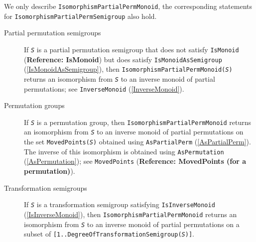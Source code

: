\documentclass[a4paper,11pt]{report}
\begin{document}
{{{ We only describe \texttt{IsomorphismPartialPermMonoid}, the corresponding statements for \texttt{IsomorphismPartialPermSemigroup} also hold. 
\begin{description}
\item[{Partial permutation semigroups}]  If \mbox{\texttt{\mdseries\slshape S}} is a partial permutation semigroup that does not satisfy \texttt{IsMonoid} (\textbf{Reference: IsMonoid}) but does satisfy \texttt{IsMonoidAsSemigroup} (\ref{IsMonoidAsSemigroup}), then \texttt{IsomorphismPartialPermMonoid(\mbox{\texttt{\mdseries\slshape S}})} returns an isomorphism from \mbox{\texttt{\mdseries\slshape S}} to an inverse monoid of partial permutations; see \texttt{InverseMonoid} (\ref{InverseMonoid}). 
\item[{Permutation groups}]  If \mbox{\texttt{\mdseries\slshape S}} is a permutation group, then \texttt{IsomorphismPartialPermMonoid} returns an isomorphism from \mbox{\texttt{\mdseries\slshape S}} to an inverse monoid of partial permutations on the set \texttt{MovedPoints(\mbox{\texttt{\mdseries\slshape S}})} obtained using \texttt{AsPartialPerm} (\ref{AsPartialPerm}). The inverse of this isomorphism is obtained using \texttt{AsPermutation} (\ref{AsPermutation}); see \texttt{MovedPoints} (\textbf{Reference: MovedPoints (for a permutation)}). 
\item[{Transformation semigroups}]  If \mbox{\texttt{\mdseries\slshape S}} is a transformation semigroup satisfying \texttt{IsInverseMonoid} (\ref{IsInverseMonoid}), then \texttt{IsomorphismPartialPermMonoid} returns an isomorphism from \mbox{\texttt{\mdseries\slshape S}} to an inverse monoid of partial permutations on a subset of \texttt{[1..DegreeOfTransformationSemigroup(\mbox{\texttt{\mdseries\slshape S}})]}. 
\end{description}
 
}}}
\end{document}
